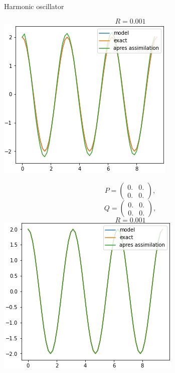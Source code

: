\begin{frame}{Harmonic oscillator}
\begin{minipage}{.32\linewidth}
           $$R=0.001$$
           \includegraphics[width=\linewidth]{"images/enkf/oscillator2_b.png"}
       \end{minipage} \;
       \begin{minipage}{.32\linewidth}
           \centering
           $$P=\begin{pmatrix}
               0. & 0. \\
               0. & 0. 
           \end{pmatrix} ,$$
           $$Q=\begin{pmatrix}
               0. & 0. \\
               0. & 0. 
           \end{pmatrix} ,$$
           $$R=0.001$$
           \includegraphics[width=\linewidth]{"images/enkf/oscillator3_b.png"}
       \end{minipage}
   

\end{frame}
